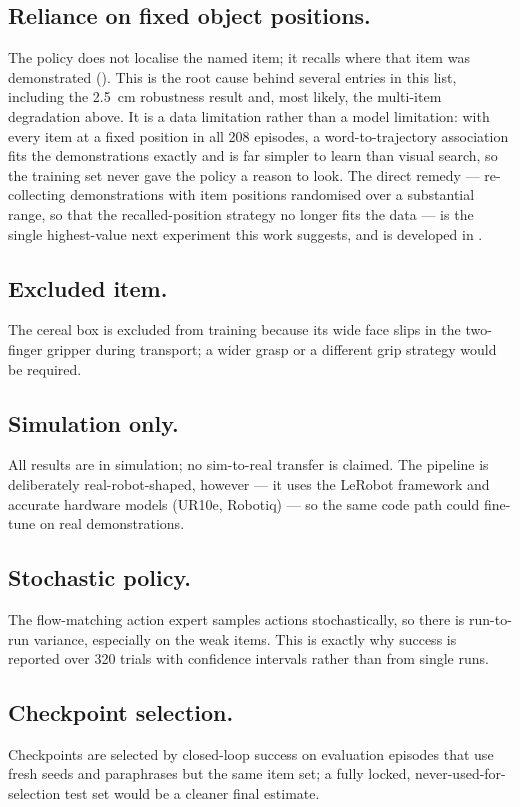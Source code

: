 \subsection{Reliance on fixed object positions.} The policy does not localise the named
item; it recalls where that item was demonstrated (). This
is the root cause behind several entries in this list, including the \SI{2.5}{cm}
robustness result and, most likely, the multi-item degradation above. It is a data
limitation rather than a model limitation: with every item at a fixed position in all
208 episodes, a word-to-trajectory association fits the demonstrations exactly and is
far simpler to learn than visual search, so the training set never gave the policy a
reason to look. The direct remedy --- re-collecting demonstrations with item positions
randomised over a substantial range, so that the recalled-position strategy no longer
fits the data --- is the single highest-value next experiment this work suggests, and is
developed in .

\subsection{Excluded item.} The cereal box is excluded from training because its
wide face slips in the two-finger gripper during transport; a wider grasp or a
different grip strategy would be required.

\subsection{Simulation only.} All results are in simulation; no sim-to-real transfer
is claimed. The pipeline is deliberately real-robot-shaped, however --- it uses the
LeRobot framework and accurate hardware models (UR10e, Robotiq) --- so the same
code path could fine-tune on real demonstrations.

\subsection{Stochastic policy.} The flow-matching action expert samples actions
stochastically, so there is run-to-run variance, especially on the weak items. This
is exactly why success is reported over 320 trials with confidence intervals rather
than from single runs.

\subsection{Checkpoint selection.} Checkpoints are selected by closed-loop success on
evaluation episodes that use fresh seeds and paraphrases but the same item set; a
fully locked, never-used-for-selection test set would be a cleaner final estimate.


